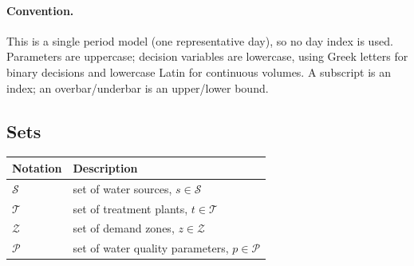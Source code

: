 \documentclass[10pt]{article}
\begin{document}
\paragraph{Convention.} This is a single period model (one representative day),
so no day index is used. Parameters are uppercase;
decision variables are lowercase, using Greek letters for binary decisions and lowercase Latin for continuous volumes. A subscript is an index; an overbar/underbar is an upper/lower bound.

\subsection{Sets}
\begin{center}
    \begin{tabular}{@{}ll@{}}
        \toprule
        \textbf{Notation} & \textbf{Description}                                 \\
        \midrule
        $\mathcal{S}$     & set of water sources, $s \in \mathcal{S}$            \\
        $\mathcal{T}$     & set of treatment plants, $t \in \mathcal{T}$         \\
        $\mathcal{Z}$     & set of demand zones, $z \in \mathcal{Z}$             \\
        $\mathcal{P}$     & set of water quality parameters, $p \in \mathcal{P}$ \\
        \bottomrule
    \end{tabular}
\end{center}
\end{document}
